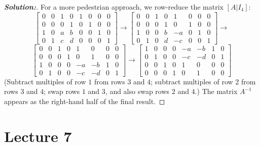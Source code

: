 \documentclass[a4paper]{amsart}
\theoremstyle{definition}
\newenvironment{solution}{\begin{proof}[\textbf{Solution:}] \vphantom{u}}{\end{proof}}
\begin{document}
\begin{solution}
 For a more pedestrian approach, we row-reduce the matrix $[A|I_4]$:
 \[ \left[\begin{array}{cccc|cccc}
     0&0&1&0 & 1&0&0&0 \\
     0&0&0&1 & 0&1&0&0 \\
     1&0&a&b & 0&0&1&0 \\
     0&1&c&d & 0&0&0&1
    \end{array}\right]
    \to 
    \left[\begin{array}{cccc|cccc}
     0&0&1&0 &  1&0&0&0 \\
     0&0&0&1 &  0&1&0&0 \\
     1&0&0&b & -a&0&1&0 \\
     0&1&0&d & -c&0&0&1
    \end{array}\right]
    \to 
 \] \[
    \left[\begin{array}{cccc|cccc}
     0&0&1&0 &  1& 0&0&0 \\
     0&0&0&1 &  0& 1&0&0 \\
     1&0&0&0 & -a&-b&1&0 \\
     0&1&0&0 & -c&-d&0&1
    \end{array}\right]
    \to 
    \left[\begin{array}{cccc|cccc}
     1&0&0&0 & -a&-b&1&0 \\
     0&1&0&0 & -c&-d&0&1 \\
     0&0&1&0 &  1& 0&0&0 \\
     0&0&0&1 &  0& 1&0&0 
    \end{array}\right]    
 \]
 (Subtract multiples of row $1$ from rows $3$ and $4$; subtract
 multiples of row $2$ from rows $3$ and $4$; swap rows $1$ and $3$,
 and also swap rows $2$ and $4$.)  The matrix $A^{-1}$ appears as the
 right-hand half of the final result.
\end{solution}

\section{Lecture 7}
\end{document}
